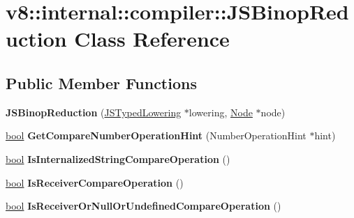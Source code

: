 \hypertarget{classv8_1_1internal_1_1compiler_1_1JSBinopReduction}{}\section{v8\+:\+:internal\+:\+:compiler\+:\+:J\+S\+Binop\+Reduction Class Reference}
\label{classv8_1_1internal_1_1compiler_1_1JSBinopReduction}
\subsection*{Public Member Functions}
\begin{DoxyCompactItemize}
\item 
\mbox{\label{classv8_1_1internal_1_1compiler_1_1JSBinopReduction_ab9693e05ed9560c2c8f147e4ffbeef4f}} 
{\bfseries J\+S\+Binop\+Reduction} (\mbox{\hyperlink{classv8_1_1internal_1_1compiler_1_1JSTypedLowering}{J\+S\+Typed\+Lowering}} $\ast$lowering, \mbox{\hyperlink{classv8_1_1internal_1_1compiler_1_1Node}{Node}} $\ast$node)
\item 
\mbox{\label{classv8_1_1internal_1_1compiler_1_1JSBinopReduction_a4e1da8d127ba5877a0ebe63beb10ef3a}} 
\mbox{\hyperlink{classbool}{bool}} {\bfseries Get\+Compare\+Number\+Operation\+Hint} (Number\+Operation\+Hint $\ast$hint)
\item 
\mbox{\label{classv8_1_1internal_1_1compiler_1_1JSBinopReduction_a86ebf986a32f62ac0512a702e7abdb95}} 
\mbox{\hyperlink{classbool}{bool}} {\bfseries Is\+Internalized\+String\+Compare\+Operation} ()
\item 
\mbox{\label{classv8_1_1internal_1_1compiler_1_1JSBinopReduction_abf3292fee55765e6ce03c7a5f3f0b9a7}} 
\mbox{\hyperlink{classbool}{bool}} {\bfseries Is\+Receiver\+Compare\+Operation} ()
\item 
\mbox{\label{classv8_1_1internal_1_1compiler_1_1JSBinopReduction_a345ab31b180d9a30e5224ab1b581a90a}} 
\mbox{\hyperlink{classbool}{bool}} {\bfseries Is\+Receiver\+Or\+Null\+Or\+Undefined\+Compare\+Operation} ()

\end{DoxyCompactItemize}
